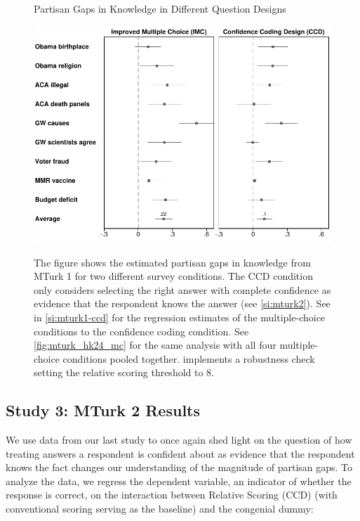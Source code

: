 \documentclass[12pt, letterpaper]{article}
\begin{document}
\begin{center}
	\begin{figure}[ht]
		\centering
		\caption{Partisan Gaps in Knowledge in Different Question Designs}
		\includegraphics[width=.9\textwidth]{../figs/partisan-gap-by-item-arm-14k-24k.pdf}
		\label{fig:mturk_hk24}
		\caption*{\footnotesize
			The figure shows the estimated partisan gaps in knowledge from MTurk 1 for two different survey conditions. The CCD condition only considers selecting the right answer with complete confidence as evidence that the respondent knows the answer (see \cref{si:mturk2}).
            See  in \cref{si:mturk1-ccd} for the regression estimates of the multiple-choice conditions to the confidence coding condition.
            See \cref{fig:mturk_hk24_mc} for the same analysis with all four multiple-choice conditions pooled together.
             implements a robustness check setting the relative scoring threshold to 8.
		}
	\end{figure}
\end{center}

\subsection*{Study 3: MTurk 2 Results}

We use data from our last study to once again shed light on the question of how treating answers a respondent is confident about as evidence that the respondent knows the fact changes our understanding of the magnitude of partisan gaps. To analyze the data, we regress the dependent variable, an indicator of whether the response is correct, on the interaction between Relative Scoring (CCD) (with conventional scoring serving as the baseline) and the congenial dummy:
\end{document}
